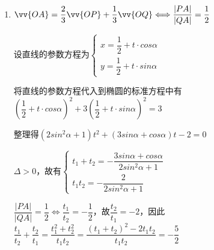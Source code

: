 \begin{enumerate}
\begin{jieda}
\begin{enumerate}
            易知直线斜率为0时不符合要求，设$PQ: x = my + 1$，联立直线和椭圆方程$\left\{\begin{array}{l}
                 \dfrac{{x}^{2}}{3} + y^2 = 1  \\
                 x = my + 1
            \end{array}\right.$，则$(my + 1)^2 + 3y^2 = 3$，即$(m^2+3)y^2+2my-2=0$，故$\left\{\begin{array}{l}
                 y_P+y_Q = \dfrac{-2m}{m^2+3} \\
                 y_Py_Q = \dfrac{-2}{m^2+3}
            \end{array}\right.$

            故有$\dfrac{(y_P+y_Q)^2}{y_Py_Q} - 2 = \dfrac{\left(\dfrac{-2m}{m^2+3}\right)^2}{\dfrac{-2}{m^2+3}} - 2 = \dfrac{-2m^2}{(m^2+3)} - 2 = -\dfrac{5}{2}$

            即$\dfrac{-2m^2}{(m^2+3)} = -\dfrac{1}{2}$，即$m^2+3 = 4m^2$，故$m = \pm 1$, 所以直线方程为 $y =  \pm \left( {x - 1}\right)$ .
            \item $\vv{OA} = \dfrac{2}{3}\vv{OP} + \dfrac{1}{3}\vv{OQ} \Longleftrightarrow \dfrac{|PA|}{|QA|} = \dfrac{1}{2}$

            设直线的参数方程为$\left\{\begin{array}{l}
                 x = \dfrac{1}{2} + t \cdot cos\alpha \\
                 y = \dfrac{1}{2} + t \cdot sin\alpha
            \end{array}\right.$

            将直线的参数方程代入到椭圆的标准方程中有$\left(\dfrac{1}{2} + t \cdot cos\alpha\right)^2 + 3\left(\dfrac{1}{2} + t \cdot sin\alpha\right)^2 = 3$

            整理得$(2sin^2\alpha + 1)t^2+(3sin\alpha+cos\alpha)t - 2 = 0$

            $\Delta > 0$，故有$\left\{\begin{array}{l}
                 t_1+t_2 = -\dfrac{3sin\alpha + cos\alpha}{2sin^2\alpha + 1} \\
                 t_1t_2 = -\dfrac{2}{2sin^2\alpha + 1}
            \end{array}\right.$

            $\dfrac{|PA|}{|QA|} = \dfrac{1}{2} \Longleftrightarrow \dfrac{t_1}{t_2} = -\dfrac{1}{2}$，故$\dfrac{t_2}{t_1} = -2$，因此$\dfrac{t_1}{t_2} + \dfrac{t_2}{t_1} = \dfrac{t_1^2+t_2^2}{t_1t_2} = \dfrac{(t_1+t_2)^2 - 2t_1t_2}{t_1t_2} = -\dfrac{5}{2}$


\end{enumerate}
\end{jieda}
\end{enumerate}
